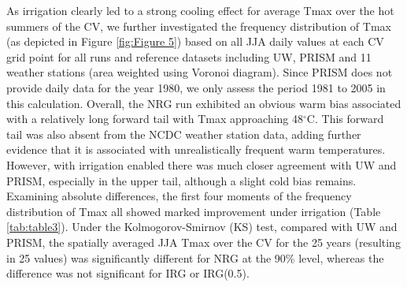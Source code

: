 As irrigation clearly led to a strong cooling effect for average Tmax over the hot summers of the CV, we further investigated the frequency distribution of Tmax (as depicted in Figure \ref{fig:Figure 5}) based on all JJA daily values at each CV grid point for all runs and reference datasets including UW, PRISM and 11 weather stations (area weighted using Voronoi diagram). Since PRISM does not provide daily data for the year 1980, we only assess the period 1981 to 2005 in this calculation. Overall, the NRG run exhibited an obvious warm bias associated with a relatively long forward tail with Tmax approaching 48$^\circ$C.  This forward tail was also absent from the NCDC weather station data, adding further evidence that it is associated with unrealistically frequent warm temperatures. However, with irrigation enabled there was much closer agreement with UW and PRISM, especially in the upper tail, although a slight cold bias remains. Examining absolute differences, the first four moments of the frequency distribution of Tmax all showed marked improvement under irrigation (Table \ref{tab:table3}). Under the Kolmogorov-Smirnov (KS) test, compared with UW and PRISM, the spatially averaged JJA Tmax over the CV for the 25 years (resulting in 25 values) was significantly different for NRG at the 90\% level, whereas the difference was not significant for IRG or IRG(0.5).

